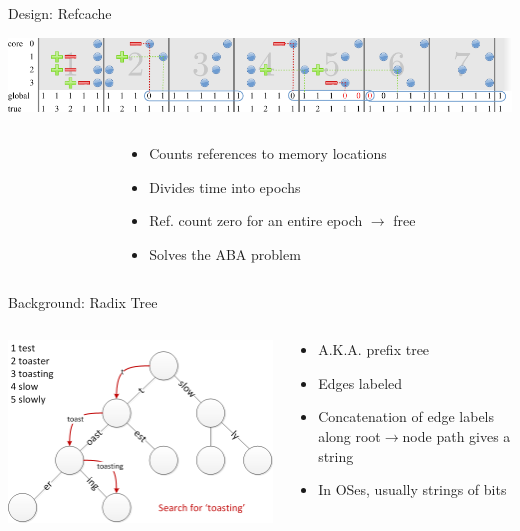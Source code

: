 \documentclass[aspectratio=169]{beamer}
\newcommand{\bi}{\begin{itemize}}
\newcommand{\ei}{\end{itemize}}
\begin{document}
\begin{frame}{Design: Refcache}
  \begin{center}
  \includegraphics[scale=0.9]{./figures/refcache.pdf}
  \end{center}
  \begin{columns}[T]
    \begin{column}{0.4\textwidth}
    \end{column}
    \begin{column}{0.6\textwidth}
      \bi
    \item Counts references to memory locations
    \item Divides time into epochs
    \item Ref. count zero for an entire epoch $\rightarrow$ free
    \item Solves the ABA problem
      \ei
    \end{column}
  \end{columns}
\end{frame}

\begin{frame}{Background: Radix Tree}
  \begin{columns}[T]
    \begin{column}{0.5\textwidth}
      \begin{center}
        \includegraphics[scale=0.6]{./figures/Patricia_trie.png}
      \end{center}
    \end{column}
    \begin{column}{0.5\textwidth}
      \bi
    \item A.K.A. prefix tree
    \item Edges labeled
    \item Concatenation of edge labels along root$\rightarrow$node path gives a string
    \item In OSes, usually strings of bits
      \ei
    \end{column}
  \end{columns}
\end{frame}
\end{document}
